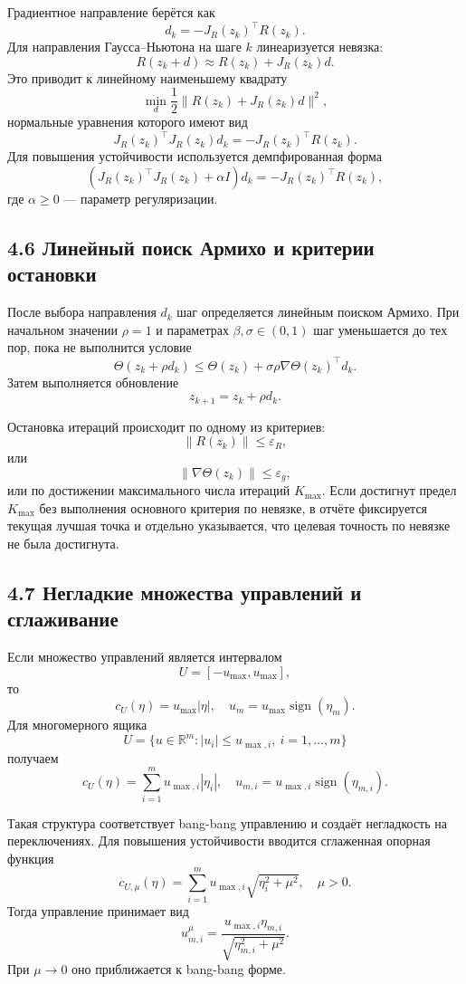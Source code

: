 \documentclass[a4paper,12pt]{article}
\begin{document}
Градиентное направление берётся как
\[
d_k=-J_R(z_k)^\top R(z_k).
\]
Для направления Гаусса--Ньютона на шаге $k$ линеаризуется невязка:
\[
R(z_k+d)\approx R(z_k)+J_R(z_k)d.
\]
Это приводит к линейному наименьшему квадрату
\[
\min_d \frac12\|R(z_k)+J_R(z_k)d\|^2,
\]
нормальные уравнения которого имеют вид
\[
J_R(z_k)^\top J_R(z_k)d_k=-J_R(z_k)^\top R(z_k).
\]
Для повышения устойчивости используется демпфированная форма
\[
\left(J_R(z_k)^\top J_R(z_k)+\alpha I\right)d_k=-J_R(z_k)^\top R(z_k),
\]
где $\alpha\ge 0$ --- параметр регуляризации.

\subsection{4.6 Линейный поиск Армихо и критерии остановки}

После выбора направления $d_k$ шаг определяется линейным поиском Армихо. При начальном значении $\rho=1$ и параметрах $\beta,\sigma\in(0,1)$ шаг уменьшается до тех пор, пока не выполнится условие
\[
\Theta(z_k+\rho d_k)\le
\Theta(z_k)+\sigma\rho\nabla\Theta(z_k)^\top d_k.
\]
Затем выполняется обновление
\[
z_{k+1}=z_k+\rho d_k.
\]

Остановка итераций происходит по одному из критериев:
\[
\|R(z_k)\|\le \varepsilon_R,
\]
или
\[
\|\nabla\Theta(z_k)\|\le \varepsilon_g,
\]
или по достижении максимального числа итераций $K_{\max}$. Если достигнут предел $K_{\max}$ без выполнения основного критерия по невязке, в отчёте фиксируется текущая лучшая точка и отдельно указывается, что целевая точность по невязке не была достигнута.

\subsection{4.7 Негладкие множества управлений и сглаживание}

Если множество управлений является интервалом
\[
U=[-u_{\max},u_{\max}],
\]
то
\[
c_U(\eta)=u_{\max}|\eta|,\quad
u_m=u_{\max}\operatorname{sign}(\eta_m).
\]
Для многомерного ящика
\[
U=\{u\in\mathbb{R}^m: |u_i|\le u_{\max,i},\ i=1,\ldots,m\}
\]
получаем
\[
c_U(\eta)=\sum_{i=1}^m u_{\max,i}|\eta_i|,\quad
u_{m,i}=u_{\max,i}\operatorname{sign}(\eta_{m,i}).
\]

Такая структура соответствует bang-bang управлению и создаёт негладкость на переключениях. Для повышения устойчивости вводится сглаженная опорная функция\cite[с. 37--51]{blagodatskikh2001}\cite[с. 8--9]{avvakumov1995}
\[
c_{U,\mu}(\eta)=
\sum_{i=1}^m u_{\max,i}\sqrt{\eta_i^2+\mu^2},
\quad \mu>0.
\]
Тогда управление принимает вид
\[
u_{m,i}^{\mu}=
\frac{u_{\max,i}\eta_{m,i}}{\sqrt{\eta_{m,i}^2+\mu^2}}.
\]
При $\mu\to 0$ оно приближается к bang-bang форме.
\end{document}
